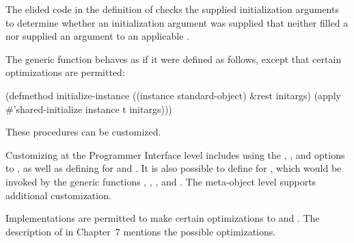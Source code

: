 The elided code in the definition of  checks the
supplied initialization arguments to determine whether an initialization
argument was supplied that neither filled a  nor supplied an argument
to an applicable . 
                      
The generic function  behaves as if it were
defined as follows, except that certain optimizations are permitted:

\code
 (defmethod initialize-instance ((instance standard-object) &rest initargs)
   (apply #'shared-initialize instance t initargs)))
\endcode

These procedures can be customized.
                                                                  
Customizing at the Programmer Interface level includes using the 
, , and  options to
, as well as defining 
for 
and .  It is also possible to define
 for , which would be invoked by the
generic functions , 
, 
, and 
.  
The meta-object level supports additional
customization.
                                                                
Implementations are permitted to make certain optimizations to 
 and .  
The description of  in Chapter~7 mentions the
possible optimizations.

